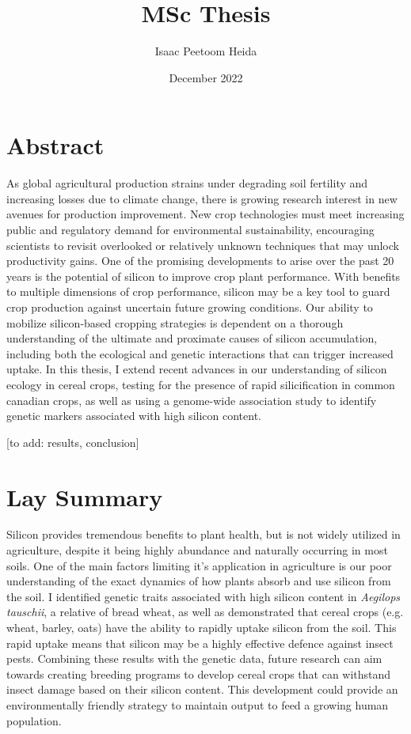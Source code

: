 \documentclass[12pt, letterpaper, ]{report}
\title{MSc Thesis}
\author{Isaac Peetoom Heida}
\date{December 2022}
\begin{document}


\tableofcontents

\chapter{Abstract}

As global agricultural production strains under degrading soil fertility and increasing losses due to climate change, there is growing research interest in new avenues for production improvement. New crop technologies must meet increasing public and regulatory demand for environmental sustainability, encouraging scientists to revisit overlooked or relatively unknown techniques that may unlock productivity gains. One of the promising developments to arise over the past 20 years is the potential of silicon to improve crop plant performance. With benefits to multiple dimensions of crop performance, silicon may be a key tool to guard crop production against uncertain future growing conditions. Our ability to mobilize silicon-based cropping strategies is dependent on a thorough understanding of the ultimate and proximate causes of silicon accumulation, including both the ecological and genetic interactions that can trigger increased uptake. In this thesis, I extend recent advances in our understanding of silicon ecology in cereal crops, testing for the presence of rapid silicification in common canadian crops, as well as using a  genome-wide association study to identify genetic markers associated with high silicon content. 

[to add: results, conclusion]

\chapter{Lay Summary}

Silicon provides tremendous benefits to plant health, but is not widely utilized in agriculture, despite it being highly abundance and naturally occurring in most soils. One of the main factors limiting it's application in agriculture is our poor understanding of the exact dynamics of how plants absorb and use silicon from the soil. I identified genetic traits associated with high silicon content in \textit{Aegilops tauschii}, a relative of bread wheat, as well as demonstrated that cereal crops (e.g. wheat, barley, oats) have the ability to rapidly uptake silicon from the soil. This rapid uptake means that silicon may be a highly effective defence against insect pests. Combining these results with the genetic data, future research can aim towards creating breeding programs to develop cereal crops that can withstand insect damage based on their silicon content. This development could provide an environmentally friendly strategy to maintain output to feed a growing human population.
\end{document}
